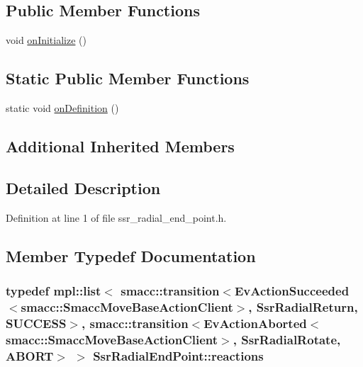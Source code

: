 \subsection*{Public Member Functions}
\begin{DoxyCompactItemize}
\item 
void \hyperlink{structSsrRadialEndPoint_a193b193a7a831dcdf586686c0c309f73}{on\+Initialize} ()
\end{DoxyCompactItemize}
\subsection*{Static Public Member Functions}
\begin{DoxyCompactItemize}
\item 
static void \hyperlink{structSsrRadialEndPoint_a99cb9ca368254cff94843a32d791bd6c}{on\+Definition} ()
\end{DoxyCompactItemize}
\subsection*{Additional Inherited Members}


\subsection{Detailed Description}


Definition at line 1 of file ssr\+\_\+radial\+\_\+end\+\_\+point.\+h.



\subsection{Member Typedef Documentation}
\subsubsection[{\texorpdfstring{reactions}{reactions}}]{\setlength{\rightskip}{0pt plus 5cm}typedef mpl\+::list$<$ {\bf smacc\+::transition}$<$Ev\+Action\+Succeeded$<${\bf smacc\+::\+Smacc\+Move\+Base\+Action\+Client}$>$, {\bf Ssr\+Radial\+Return}, {\bf S\+U\+C\+C\+E\+SS}$>$, {\bf smacc\+::transition}$<$Ev\+Action\+Aborted$<${\bf smacc\+::\+Smacc\+Move\+Base\+Action\+Client}$>$, {\bf Ssr\+Radial\+Rotate}, {\bf A\+B\+O\+RT}$>$ $>$ {\bf Ssr\+Radial\+End\+Point\+::reactions}}\hypertarget{structSsrRadialEndPoint_abf6a36586cc82daa3bdb476bba2f8772}{}\label{structSsrRadialEndPoint_abf6a36586cc82daa3bdb476bba2f8772}


